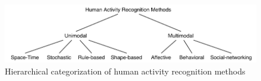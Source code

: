 \begin{figure}[htb]
  \centering
    \includegraphics[width=\textwidth,keepaspectratio]
    {images/introduction/har-taxonomy.pdf}
    \caption{Hierarchical categorization of human activity recognition methods}
    \label{har-taxonomy}
\end{figure}










